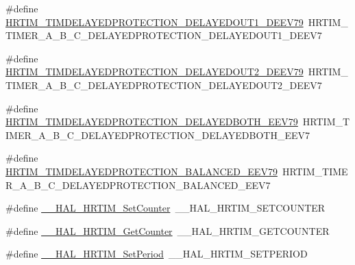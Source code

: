 \begin{DoxyCompactItemize}
\item 
\#define \hyperlink{group___h_a_l___h_r_t_i_m___aliased___macros_gaf2fa730ef2ff94596dc103780c6ea28a}{H\+R\+T\+I\+M\+\_\+\+T\+I\+M\+D\+E\+L\+A\+Y\+E\+D\+P\+R\+O\+T\+E\+C\+T\+I\+O\+N\+\_\+\+D\+E\+L\+A\+Y\+E\+D\+O\+U\+T1\+\_\+\+D\+E\+E\+V79}~H\+R\+T\+I\+M\+\_\+\+T\+I\+M\+E\+R\+\_\+\+A\+\_\+\+B\+\_\+\+C\+\_\+\+D\+E\+L\+A\+Y\+E\+D\+P\+R\+O\+T\+E\+C\+T\+I\+O\+N\+\_\+\+D\+E\+L\+A\+Y\+E\+D\+O\+U\+T1\+\_\+\+D\+E\+E\+V7
\item 
\#define \hyperlink{group___h_a_l___h_r_t_i_m___aliased___macros_ga8facb4c8782a5539246df190451ebf91}{H\+R\+T\+I\+M\+\_\+\+T\+I\+M\+D\+E\+L\+A\+Y\+E\+D\+P\+R\+O\+T\+E\+C\+T\+I\+O\+N\+\_\+\+D\+E\+L\+A\+Y\+E\+D\+O\+U\+T2\+\_\+\+D\+E\+E\+V79}~H\+R\+T\+I\+M\+\_\+\+T\+I\+M\+E\+R\+\_\+\+A\+\_\+\+B\+\_\+\+C\+\_\+\+D\+E\+L\+A\+Y\+E\+D\+P\+R\+O\+T\+E\+C\+T\+I\+O\+N\+\_\+\+D\+E\+L\+A\+Y\+E\+D\+O\+U\+T2\+\_\+\+D\+E\+E\+V7
\item 
\#define \hyperlink{group___h_a_l___h_r_t_i_m___aliased___macros_ga81abc6daa4a2456ca1428c3fe1796e52}{H\+R\+T\+I\+M\+\_\+\+T\+I\+M\+D\+E\+L\+A\+Y\+E\+D\+P\+R\+O\+T\+E\+C\+T\+I\+O\+N\+\_\+\+D\+E\+L\+A\+Y\+E\+D\+B\+O\+T\+H\+\_\+\+E\+E\+V79}~H\+R\+T\+I\+M\+\_\+\+T\+I\+M\+E\+R\+\_\+\+A\+\_\+\+B\+\_\+\+C\+\_\+\+D\+E\+L\+A\+Y\+E\+D\+P\+R\+O\+T\+E\+C\+T\+I\+O\+N\+\_\+\+D\+E\+L\+A\+Y\+E\+D\+B\+O\+T\+H\+\_\+\+E\+E\+V7
\item 
\#define \hyperlink{group___h_a_l___h_r_t_i_m___aliased___macros_gad90cefe9f64cf5f3efe38213706b4f94}{H\+R\+T\+I\+M\+\_\+\+T\+I\+M\+D\+E\+L\+A\+Y\+E\+D\+P\+R\+O\+T\+E\+C\+T\+I\+O\+N\+\_\+\+B\+A\+L\+A\+N\+C\+E\+D\+\_\+\+E\+E\+V79}~H\+R\+T\+I\+M\+\_\+\+T\+I\+M\+E\+R\+\_\+\+A\+\_\+\+B\+\_\+\+C\+\_\+\+D\+E\+L\+A\+Y\+E\+D\+P\+R\+O\+T\+E\+C\+T\+I\+O\+N\+\_\+\+B\+A\+L\+A\+N\+C\+E\+D\+\_\+\+E\+E\+V7
\item 
\#define \hyperlink{group___h_a_l___h_r_t_i_m___aliased___macros_gaa11c36c62453d27a8dd6db62917fb463}{\+\_\+\+\_\+\+H\+A\+L\+\_\+\+H\+R\+T\+I\+M\+\_\+\+Set\+Counter}~\+\_\+\+\_\+\+H\+A\+L\+\_\+\+H\+R\+T\+I\+M\+\_\+\+S\+E\+T\+C\+O\+U\+N\+T\+ER
\item 
\#define \hyperlink{group___h_a_l___h_r_t_i_m___aliased___macros_ga884c22338dec011ab9e4055589c6cd01}{\+\_\+\+\_\+\+H\+A\+L\+\_\+\+H\+R\+T\+I\+M\+\_\+\+Get\+Counter}~\+\_\+\+\_\+\+H\+A\+L\+\_\+\+H\+R\+T\+I\+M\+\_\+\+G\+E\+T\+C\+O\+U\+N\+T\+ER
\item 
\#define \hyperlink{group___h_a_l___h_r_t_i_m___aliased___macros_ga3e6ec773e1fd492d3cc4e9ff84054675}{\+\_\+\+\_\+\+H\+A\+L\+\_\+\+H\+R\+T\+I\+M\+\_\+\+Set\+Period}~\+\_\+\+\_\+\+H\+A\+L\+\_\+\+H\+R\+T\+I\+M\+\_\+\+S\+E\+T\+P\+E\+R\+I\+OD

\end{DoxyCompactItemize}
